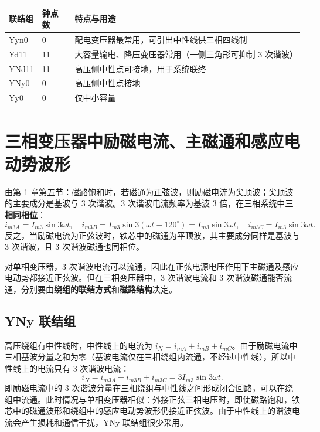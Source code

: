 \begin{center}
\begin{tabular}{@{}lll@{}}
\toprule
联结组 & 钟点数 & 特点与用途 \\
\midrule
Yyn0 & 0 & 配电变压器最常用，可引出中性线供三相四线制 \\
Yd11 & 11 & 大容量输电、降压变压器常用（一侧三角形可抑制 3 次谐波） \\
YNd11 & 11 & 高压侧中性点可接地，用于系统联络 \\
YNy0 & 0 & 高压侧中性点接地 \\
Yy0 & 0 & 仅中小容量 \\
\bottomrule
\end{tabular}
\end{center}


\section{三相变压器中励磁电流、主磁通和感应电动势波形}

由第 1 章第五节：磁路饱和时，若磁通为正弦波，则励磁电流为尖顶波；尖顶波的主要成分是基波与 3 次谐波。3 次谐波电流频率为基波 3 倍，在三相系统中\textbf{三相同相位}：
\begin{equation}
i_{m3A}=I_{m3}\sin3\omega t,\quad
i_{m3B}=I_{m3}\sin3\left(\omega t-120^\circ\right)=I_{m3}\sin3\omega t,\quad
i_{m3C}=I_{m3}\sin3\omega t .
\end{equation}
反之，当励磁电流为正弦波时，铁芯中的磁通为平顶波，其主要成分同样是基波与 3 次谐波，且 3 次谐波磁通也同相位。

对单相变压器，3 次谐波电流可以流通，因此在正弦电源电压作用下主磁通及感应电动势都接近正弦波。但在三相变压器中，3 次谐波电流和 3 次谐波磁通能否流通，分别要由\textbf{绕组的联结方式}和\textbf{磁路结构}决定。

\subsection{YNy 联结组}
高压绕组有中性线时，中性线上的电流为 $i_N=i_{mA}+i_{mB}+i_{mC}$。由于励磁电流中三相基波分量之和为零（基波电流仅在三相绕组内流通，不经过中性线），所以中性线上的电流只有 3 次谐波电流：
\begin{equation}
i_N=i_{m3A}+i_{m3B}+i_{m3C}=3I_{m3}\sin3\omega t .
\end{equation}
即励磁电流中的 3 次谐波分量在三相绕组与中性线之间形成闭合回路，可以在绕组中流通。此时情况与单相变压器相似：外接正弦三相电压时，即使磁路饱和，铁芯中的磁通波形和绕组中的感应电动势波形仍接近正弦波。由于中性线上的谐波电流会产生损耗和通信干扰，YNy 联结组很少采用。

